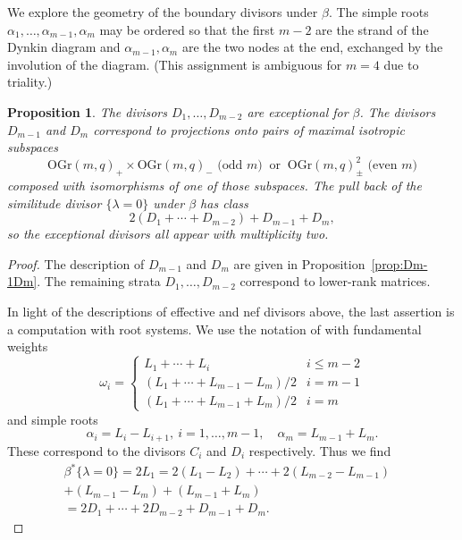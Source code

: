 \documentclass[12pt]{amsart}
\numberwithin{equation}{section}
\newcommand{\OGr}{\mathrm{OGr}}
\theoremstyle{plain}
\newtheorem{prop}{Proposition}[section]
\theoremstyle{definition}
\theoremstyle{remark}
\begin{document}
We explore the geometry of the boundary divisors under 
$\beta$. The simple roots $\alpha_1,\ldots,\alpha_{m-1},\alpha_m$
may be ordered so that the first $m-2$ are the strand
of the Dynkin diagram and $\alpha_{m-1},\alpha_m$ are the
two nodes at the end, exchanged by the involution of the
diagram. (This assignment is ambiguous for $m=4$ due to triality.)

\begin{prop} \label{prop:excmulttwo}
The divisors $D_1,\ldots,D_{m-2}$ are exceptional for 
$\beta$. 
The divisors $D_{m-1}$ and $D_m$ correspond to projections
onto pairs of maximal isotropic subspaces 
$$\OGr(m,q)_+ \times \OGr(m,q)_- \text{ (odd $m$)} \ \text{ or } \ \OGr(m,q)_{\pm}^2 \text{ (even $m$)}$$ 
composed with isomorphisms of one of those subspaces.
The pull back of the similitude divisor $\{\lambda=0\}$
under $\beta$ has class
$$2(D_1+\cdots+D_{m-2})+D_{m-1}+D_m,$$
so the exceptional divisors all appear with multiplicity two.
\end{prop}
\begin{proof} The description of $D_{m-1}$ and $D_m$ are
given in Proposition~\ref{prop:Dm-1Dm}. The remaining
strata $D_1,\ldots,D_{m-2}$ correspond to lower-rank matrices.

In light of the descriptions of effective and nef divisors above,
the last assertion is a computation with root systems. We use the notation
of \cite[19.2]{FulHar} with fundamental weights
$$\omega_i = \begin{cases} L_1+\cdots+L_i & i\le m-2 \\
                        (L_1+\cdots+L_{m-1}-L_m)/2 & i=m-1\\
                        (L_1+\cdots+L_{m-1}+L_m)/2 & i=m
                        \end{cases}
$$
and simple roots
$$\alpha_i= L_i-L_{i+1}, \ i=1,\ldots,m-1, \quad
\alpha_m=L_{m-1}+L_m.$$
These correspond to the divisors $C_i$ and $D_i$
respectively. Thus we find
\begin{align*}
\beta^*\{\lambda = 0\} = 2L_1 =
     2(L_1-L_2)+ \cdots + 
        2(L_{m-2}-L_{m-1}) & \\
         + (L_{m-1}-L_m) + (L_{m-1}+L_m) & \\
        = 2D_1+ \cdots + 2D_{m-2} + D_{m-1} + D_m. &
\end{align*}
\end{proof}
\end{document}
